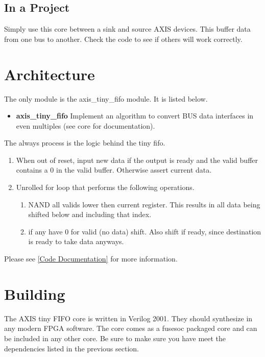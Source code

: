 

\subsection{In a Project}
\par
Simply use this core between a sink and source AXIS devices. This buffer data from one bus to another. Check the code to see if others will work correctly.

\section{Architecture}
\par
The only module is the axis\_tiny\_fifo module. It is listed below.

\begin{itemize}
  \item \textbf{axis\_tiny\_fifo} Implement an algorithm to convert BUS data interfaces in even multiples (see core for documentation).
\end{itemize}

\par
The always process is the logic behind the tiny fifo.
\begin{enumerate}
\item When out of reset, input new data if the output is ready and the valid buffer contains a 0 in the valid buffer. Otherwise assert current data.
\item Unrolled for loop that performs the following operations.
  \begin{enumerate}
    \item NAND all valids lower then current register. This results in all data being shifted below and including that index.
    \item if any have 0 for valid (no data) shift. Also shift if ready, since destination is ready to take data anyways.
  \end{enumerate}
\end{enumerate}

Please see \ref{Code Documentation} for more information.

\section{Building}

\par
The AXIS tiny FIFO core is written in Verilog 2001. They should synthesize in any modern FPGA software. The core comes as a fusesoc packaged core and can be
included in any other core. Be sure to make sure you have meet the dependencies listed in the previous section.

